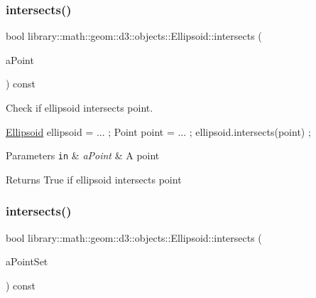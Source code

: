 \subsubsection{\texorpdfstring{intersects()}{intersects()}\hspace{0.1cm}{\footnotesize\ttfamily [1/9]}}
{\footnotesize\ttfamily bool library\+::math\+::geom\+::d3\+::objects\+::\+Ellipsoid\+::intersects (\begin{DoxyParamCaption}\item[{const \hyperlink{classlibrary_1_1math_1_1geom_1_1d3_1_1objects_1_1_point}{Point} \&}]{a\+Point }\end{DoxyParamCaption}) const}



Check if ellipsoid intersects point. 


\begin{DoxyCode}
\hyperlink{classlibrary_1_1math_1_1geom_1_1d3_1_1objects_1_1_ellipsoid_aae81fe0edc7f0e8d4590ea89ae73cb14}{Ellipsoid} ellipsoid = ... ;
Point point = ... ;
ellipsoid.intersects(point) ;
\end{DoxyCode}



\begin{DoxyParams}[1]{Parameters}
\mbox{\tt in}  & {\em a\+Point} & A point \\
\hline
\end{DoxyParams}
\begin{DoxyReturn}{Returns}
True if ellipsoid intersects point 
\end{DoxyReturn}
\mbox{\label{classlibrary_1_1math_1_1geom_1_1d3_1_1objects_1_1_ellipsoid_a2058e665b70c0e883a6ca195fa97120e}} 
\subsubsection{\texorpdfstring{intersects()}{intersects()}\hspace{0.1cm}{\footnotesize\ttfamily [2/9]}}
{\footnotesize\ttfamily bool library\+::math\+::geom\+::d3\+::objects\+::\+Ellipsoid\+::intersects (\begin{DoxyParamCaption}\item[{const \hyperlink{classlibrary_1_1math_1_1geom_1_1d3_1_1objects_1_1_point_set}{Point\+Set} \&}]{a\+Point\+Set }\end{DoxyParamCaption}) const}



